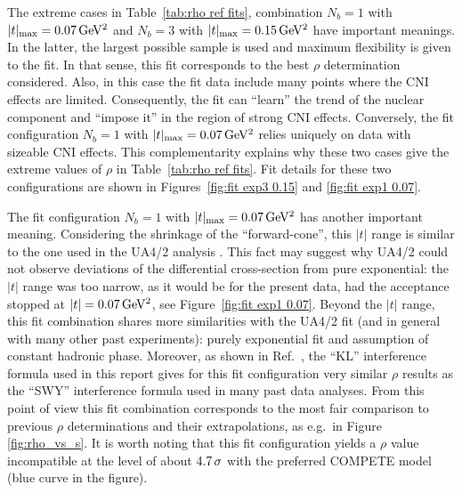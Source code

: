 The extreme cases in Table~\ref{tab:rho ref fits}, combination $N_b=1$ with $|t|_{\rm max} = 0.07\,{\rm GeV^2}$ and $N_b=3$ with $|t|_{\rm max} = 0.15\,{\rm GeV^2}$ have important meanings. In the latter, the largest possible sample is used and maximum flexibility is given to the fit. In that sense, this fit corresponds to the best $\rho$ determination considered. Also, in this case the fit data include many points where the CNI effects are limited. Consequently, the fit can ``learn'' the trend of the nuclear component and ``impose it'' in the region of strong CNI effects. Conversely, the fit configuration $N_b=1$ with $|t|_{\rm max} = 0.07\,{\rm GeV^2}$ relies uniquely on data with sizeable CNI effects. This complementarity explains why these two cases give the extreme values of $\rho$ in Table~\ref{tab:rho ref fits}. Fit details for these two configurations are shown in Figures~\ref{fig:fit exp3 0.15} and \ref{fig:fit exp1 0.07}.

The fit configuration $N_b=1$ with $|t|_{\rm max} = 0.07\,{\rm GeV^2}$ has another important meaning. Considering the shrinkage of the ``forward-cone'', this $|t|$ range is similar to the one used in the UA4/2 analysis \cite{ua4-rho}. This fact may suggest why UA4/2 could not observe deviations of the differential cross-section from pure exponential: the $|t|$ range was too narrow, as it would be for the present data, had the acceptance stopped at $|t| = 0.07\,{\rm GeV^2}$, see Figure~\ref{fig:fit exp1 0.07}. Beyond the $|t|$ range, this fit combination shares more similarities with the UA4/2 fit (and in general with many other past experiments): purely exponential fit and assumption of constant hadronic phase. Moreover, as shown in Ref.~\cite{totem-8tev-1km}, the ``KL'' interference formula \cite{kl94} used in this report gives for this fit configuration very similar $\rho$ results as the ``SWY'' interference formula \cite{wy68} used in many past data analyses. From this point of view this fit combination corresponds to the most fair comparison to previous $\rho$ determinations and their extrapolations, as e.g.~in Figure \ref{fig:rho_vs_s}. It is worth noting that this fit configuration yields a $\rho$ value incompatible at the level of about $4.7\,{\rm \sigma}$
with the preferred COMPETE model (blue curve in the figure).

